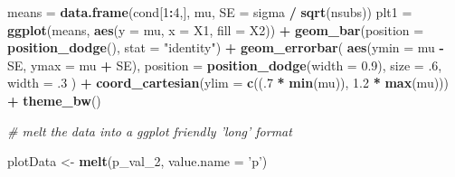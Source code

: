 \documentclass[
]{book}
\newenvironment{Shaded}{\begin{snugshade}}{\end{snugshade}}
\newcommand{\CommentTok}[1]{\textcolor[rgb]{0.56,0.35,0.01}{\textit{#1}}}
\newcommand{\DataTypeTok}[1]{\textcolor[rgb]{0.13,0.29,0.53}{#1}}
\newcommand{\DecValTok}[1]{\textcolor[rgb]{0.00,0.00,0.81}{#1}}
\newcommand{\FloatTok}[1]{\textcolor[rgb]{0.00,0.00,0.81}{#1}}
\newcommand{\KeywordTok}[1]{\textcolor[rgb]{0.13,0.29,0.53}{\textbf{#1}}}
\newcommand{\NormalTok}[1]{#1}
\newcommand{\OperatorTok}[1]{\textcolor[rgb]{0.81,0.36,0.00}{\textbf{#1}}}
\newcommand{\StringTok}[1]{\textcolor[rgb]{0.31,0.60,0.02}{#1}}
\begin{document}
\begin{Shaded}
\begin{Highlighting}[]
\NormalTok{means =}\StringTok{ }\KeywordTok{data.frame}\NormalTok{(cond[}\DecValTok{1}\OperatorTok{:}\DecValTok{4}\NormalTok{,], mu, }\DataTypeTok{SE =}\NormalTok{ sigma }\OperatorTok{/}\StringTok{ }\KeywordTok{sqrt}\NormalTok{(nsubs))}
\NormalTok{plt1 =}\StringTok{ }\KeywordTok{ggplot}\NormalTok{(means, }\KeywordTok{aes}\NormalTok{(}\DataTypeTok{y =}\NormalTok{ mu, }\DataTypeTok{x =}\NormalTok{ X1, }\DataTypeTok{fill =}\NormalTok{ X2)) }\OperatorTok{+}
\KeywordTok{geom_bar}\NormalTok{(}\DataTypeTok{position =} \KeywordTok{position_dodge}\NormalTok{(), }\DataTypeTok{stat =} \StringTok{"identity"}\NormalTok{) }\OperatorTok{+}
\KeywordTok{geom_errorbar}\NormalTok{(}
\KeywordTok{aes}\NormalTok{(}\DataTypeTok{ymin =}\NormalTok{ mu }\OperatorTok{-}\StringTok{ }\NormalTok{SE, }\DataTypeTok{ymax =}\NormalTok{ mu }\OperatorTok{+}\StringTok{ }\NormalTok{SE),}
\DataTypeTok{position =} \KeywordTok{position_dodge}\NormalTok{(}\DataTypeTok{width =} \FloatTok{0.9}\NormalTok{),}
\DataTypeTok{size =} \FloatTok{.6}\NormalTok{,}
\DataTypeTok{width =} \FloatTok{.3}
\NormalTok{) }\OperatorTok{+}
\KeywordTok{coord_cartesian}\NormalTok{(}\DataTypeTok{ylim =} \KeywordTok{c}\NormalTok{((.}\DecValTok{7} \OperatorTok{*}\StringTok{ }\KeywordTok{min}\NormalTok{(mu)), }\FloatTok{1.2} \OperatorTok{*}\StringTok{ }\KeywordTok{max}\NormalTok{(mu))) }\OperatorTok{+}
\KeywordTok{theme_bw}\NormalTok{()}
 
\CommentTok{# melt the data into a ggplot friendly 'long' format}

\NormalTok{plotData <-}\StringTok{ }\KeywordTok{melt}\NormalTok{(p_val_}\DecValTok{2}\NormalTok{, }\DataTypeTok{value.name =} \StringTok{'p'}\NormalTok{)}
 

\end{Highlighting}
\end{Shaded}
\end{document}

